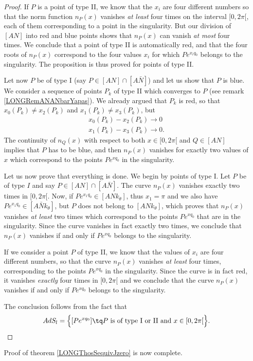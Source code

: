 \begin{proof}
If $P$ is a point of type II, we know that the $x_i$ are four different numbers so that the norm function $n_P(x)$ vanishes \emph{at least} four times on the interval $\mathopen[ 0 , 2\pi [$, each of them corresponding to a point in the singularity. But our division of $[AN]$ into red and blue points shows that $n_P(x)$ can vanish \emph{at most} four times. We conclude that a point of type II is automatically red, and that the four roots of $n_P(x)$ correspond to the four values $x_i$ for which $P e^{x_iq_0}$ belongs to the singularity. The proposition is thus proved for points of type II.

Let now $P$ be of type I (say $P\in [AN]\cap [A\bar N]$) and let us show that $P$ is blue. We consider a sequence of points $P_k$ of type II which converges to $P$ (see remark \ref{LONGRemANANbarYapas}). We already argued that $P_k$ is red, so that $x_0(P_k)\neq x_2(P_k)$ and $x_1(P_k)\neq x_3(P_k)$, but
\begin{subequations}
	\begin{align}
		x_0(P_k)-x_2(P_k)\to 0\\
		x_1(P_k)-x_3(P_k)\to 0.
	\end{align}
\end{subequations}
The continuity of $n_Q(x)$ with respect to both $x\in\mathopen[ 0 , 2\pi [$ and $Q\in[AN]$ implies that $P$ has to be blue, and then $n_P(x)$ vanishes for exactly two values of $x$ which correspond to the points $P e^{xq_0}$ in the singularity.

Let us now prove that everything is done. We begin by points of type I. Let $P$ be of type $I$ and say $P\in[AN]\cap[A\bar N]$. The curve $n_P(x)$ vanishes exactly two times in $\mathopen[ 0 , 2\pi [$. Now, if $P e^{x_1 q_0}\in[ANk_{\theta}]$, thus $x_1 = \pi$ and we also have $P e^{x_1q_0}\in[A\bar Nk_{\theta}]$, but $P$ does not belong to $[ANk_{\theta}]$, which proves that $n_P(x)$ vanishes \emph{at least} two times which correspond to the points $P e^{xq_0}$ that are in the singularity. Since the curve vanishes in fact exactly two times, we conclude that $n_P(x)$ vanishes if and only if $P e^{xq_0}$ belongs to the singularity.

If we consider a point $P$ of type II, we know that the values of $x_i$ are four different numbers, so that the curve $n_P(x)$ vanishes \emph{at least} four times, corresponding to the points $P e^{xq_0}$ in the singularity. Since the curve is in fact red, it vanishes \emph{exactly} four times in $\mathopen[ 0 , 2\pi [$ and we conclude that the curve $n_P(x)$ vanishes if and only if $P e^{xq_0}$ belongs to the singularity.

The conclusion follows from the fact that 
\begin{equation}
    AdS_l=\Big\{ [P e^{xq_0}] \tq P \text{ is of type I or II and  } x\in\mathopen[ 0 , 2\pi [ \Big\}.
\end{equation}
\end{proof}
Proof of theorem \ref{LONGThosSequivJzero} is now complete.



